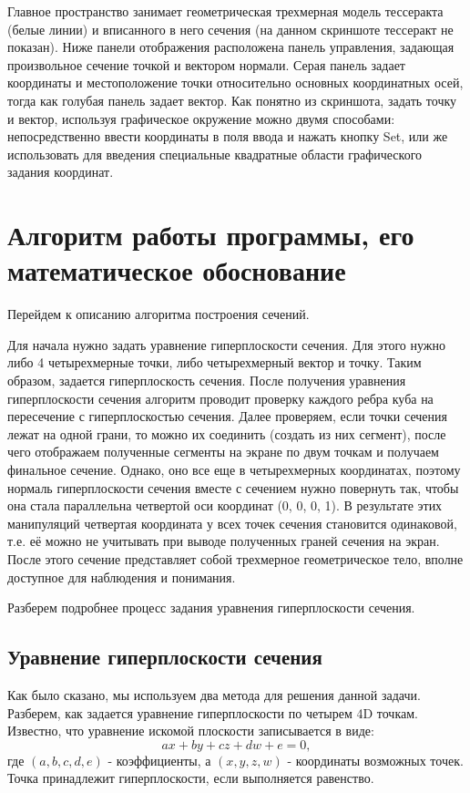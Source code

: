 \documentclass[12pt, a4paper, twoside]{report}
\begin{document}
Главное пространство занимает геометрическая трехмерная модель тессеракта (белые линии) и вписанного в него сечения (на данном скриншоте тессеракт не показан). Ниже панели отображения расположена панель управления, задающая произвольное сечение точкой и вектором нормали. Серая панель задает координаты и местоположение точки относительно основных координатных осей, тогда как голубая панель задает вектор. Как понятно из скриншота, задать точку и вектор, используя графическое окружение можно двумя способами: непосредственно ввести координаты в поля ввода и нажать кнопку Set, или же использовать для введения специальные квадратные области графического задания координат. 

\section{Алгоритм работы программы, его математическое обоснование}
Перейдем к описанию алгоритма построения сечений.

Для начала нужно задать уравнение гиперплоскости сечения. Для этого нужно либо 4 четырехмерные точки, либо четырехмерный вектор и точку. Таким образом, задается гиперплоскость сечения. После получения уравнения гиперплоскости сечения алгоритм проводит проверку каждого ребра куба на пересечение с гиперплоскостью сечения. Далее проверяем, если точки сечения лежат на одной грани, то можно их соединить (создать из них сегмент), после чего отображаем полученные сегменты на экране по двум точкам и получаем финальное сечение. Однако, оно все еще в четырехмерных координатах, поэтому нормаль гиперплоскости сечения вместе с сечением нужно повернуть так, чтобы она стала параллельна четвертой оси координат (0, 0, 0, 1). В результате этих манипуляций четвертая координата у всех точек сечения становится одинаковой, т.е. её можно не учитывать при выводе полученных граней сечения на экран. После этого сечение представляет собой трехмерное геометрическое тело, вполне доступное для наблюдения и понимания.

Разберем подробнее процесс задания уравнения гиперплоскости сечения.
\subsection{Уравнение гиперплоскости сечения}
Как было сказано, мы используем два метода для решения данной задачи. Разберем, как задается уравнение гиперплоскости по четырем 4D точкам.
Известно, что уравнение искомой плоскости записывается в виде:
$$ax + by + cz + dw + e=0,$$ где $(a,b,c,d,e)$ - коэффициенты, а $(x,y,z,w)$ - координаты возможных точек. Точка принадлежит гиперплоскости, если выполняется равенство.
\end{document}
